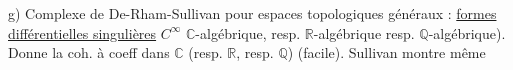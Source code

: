 g) Complexe de De-Rham-Sullivan pour espaces topologiques généraux : \uline{formes différentielles singulières} $C^\infty$  $\mathbb C$-algébrique, resp. $\mathbb R$-algébrique resp. $\mathbb Q$-algébrique). Donne la coh. à coeff dans $\mathbb C$ (resp. $\mathbb R$, resp. $\mathbb Q$) (facile). Sullivan montre même

